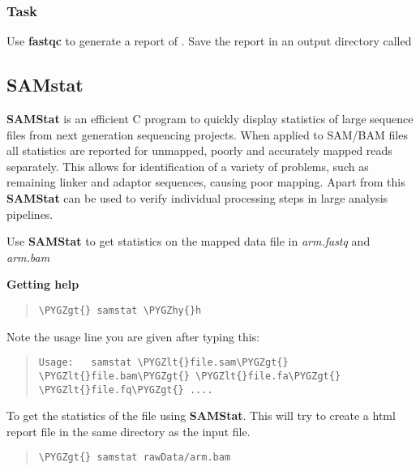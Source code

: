 \documentclass[a4paper,11pt,english]{sphinxmanual}
\def\PYGZlt{\char`\<}
\def\PYGZgt{\char`\>}
\def\PYGZhy{\char`\-}
\begin{document}
\subsubsection{Task}
\label{exercises/STEP1_QualityControl:task}
Use \textbf{fastqc} to generate a report of . Save the report in an output directory called 


\subsection{SAMstat}
\label{exercises/STEP1_QualityControl:samstat}
\textbf{SAMStat} is an efficient C program to quickly display statistics of large sequence files from next generation sequencing projects. When applied to SAM/BAM files all statistics are reported for unmapped, poorly and accurately mapped reads separately. This allows for identification of a variety of problems, such as remaining linker and adaptor sequences, causing poor mapping. Apart from this \textbf{SAMStat} can be used to verify individual processing steps in large analysis pipelines.

Use \textbf{SAMStat} to get statistics on the mapped data file in \emph{arm.fastq} and \emph{arm.bam}

\textbf{Getting help}
\begin{quote}

\begin{Verbatim}[frame=single, rulecolor=\color{lightgray}, fontfamily=courier, commandchars=\\\{\}]
\PYGZgt{} samstat \PYGZhy{}h
\end{Verbatim}
\end{quote}

Note the usage line you are given after typing this:
\begin{quote}

\begin{Verbatim}[frame=single, rulecolor=\color{lightgray}, fontfamily=courier, commandchars=\\\{\}]
Usage:   samstat \PYGZlt{}file.sam\PYGZgt{} \PYGZlt{}file.bam\PYGZgt{} \PYGZlt{}file.fa\PYGZgt{} \PYGZlt{}file.fq\PYGZgt{} ....
\end{Verbatim}
\end{quote}

To get the statistics of the  file using \textbf{SAMStat}. This will try to create a html report file in the same directory as the input file.
\begin{quote}

\begin{Verbatim}[frame=single, rulecolor=\color{lightgray}, fontfamily=courier, commandchars=\\\{\}]
\PYGZgt{} samstat rawData/arm.bam
\end{Verbatim}
\end{quote}
\end{document}
